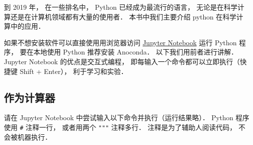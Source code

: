 
到 2019 年， 在一些排名中， Python 已经成为最流行的语言， 无论是在科学计算还是在计算机领域都有大量的使用者． 本书中我们主要介绍 python 在科学计算中的应用．

如果不想安装软件可以直接使用用浏览器访问 \href{https://jupyter.org/}{Jupyter Notebook} 运行 Python 程序， 要在本地使用 Python 推荐安装 Anoconda． 以下我们用前者进行讲解． Jupyter Notebook 的优点是交互式编程， 即每输入一个命令都可以立即执行（快捷键 Shift + Enter）， 利于学习和实验．

\subsection{作为计算器}
请在 Jupyter Notebook 中尝试输入以下命令并执行（运行结果略）． Python 程序使用 \verb|#| 注释一行，  或者用两个 \verb|"""| 注释多行． 注释是为了辅助人阅读代码， 不会被机器执行．

